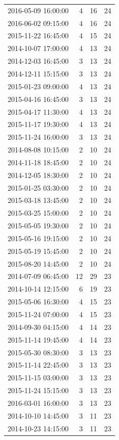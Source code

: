 \begin{tabular}{lrrr}
2016-05-09 16:00:00 & 4 & 16 & 24 \\
2016-06-02 09:15:00 & 4 & 16 & 24 \\
2015-11-22 16:45:00 & 4 & 15 & 24 \\
2014-10-07 17:00:00 & 4 & 13 & 24 \\
2014-12-03 16:45:00 & 3 & 13 & 24 \\
2014-12-11 15:15:00 & 3 & 13 & 24 \\
2015-01-23 09:00:00 & 4 & 13 & 24 \\
2015-04-16 16:45:00 & 3 & 13 & 24 \\
2015-04-17 11:30:00 & 4 & 13 & 24 \\
2015-11-17 19:30:00 & 4 & 13 & 24 \\
2015-11-24 16:00:00 & 3 & 13 & 24 \\
2014-08-08 10:15:00 & 2 & 10 & 24 \\
2014-11-18 18:45:00 & 2 & 10 & 24 \\
2014-12-05 18:30:00 & 2 & 10 & 24 \\
2015-01-25 03:30:00 & 2 & 10 & 24 \\
2015-03-18 13:45:00 & 2 & 10 & 24 \\
2015-03-25 15:00:00 & 2 & 10 & 24 \\
2015-05-05 19:30:00 & 2 & 10 & 24 \\
2015-05-16 19:15:00 & 2 & 10 & 24 \\
2015-05-19 15:45:00 & 2 & 10 & 24 \\
2015-08-20 14:45:00 & 2 & 10 & 24 \\
2014-07-09 06:45:00 & 12 & 29 & 23 \\
2014-10-14 12:15:00 & 6 & 19 & 23 \\
2015-05-06 16:30:00 & 4 & 15 & 23 \\
2015-11-24 07:00:00 & 4 & 15 & 23 \\
2014-09-30 04:15:00 & 4 & 14 & 23 \\
2015-11-14 19:45:00 & 4 & 14 & 23 \\
2015-05-30 08:30:00 & 3 & 13 & 23 \\
2015-11-14 22:45:00 & 3 & 13 & 23 \\
2015-11-15 03:00:00 & 3 & 13 & 23 \\
2015-11-24 15:15:00 & 3 & 13 & 23 \\
2016-03-01 16:00:00 & 3 & 13 & 23 \\
2014-10-10 14:45:00 & 3 & 11 & 23 \\
2014-10-23 14:15:00 & 3 & 11 & 23 \\

\end{tabular}
